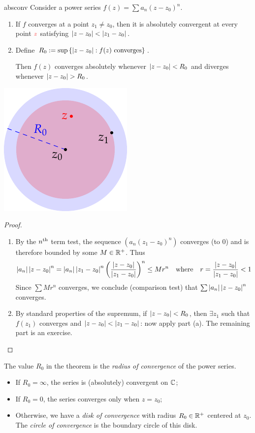 \begin{thm}[lower separated=false, sidebyside, sidebyside align=top seam, sidebyside gap=0pt, righthand width=0.25\linewidth]{}{absconv}
Consider a power series $f(z)=\sum a_n(z-z_0)^n$.
\begin{enumerate}
	\item If $f$ converges at a point $z_1\neq z_0$, then it is absolutely convergent at every point $\textcolor{red}{z}$ satisfying $\left| z-z_0\right|<\left| z_1-z_0\right|$.
	\item Define $R_0:=\sup\left\{\left| z-z_0\right|: f(z) \text{ converges}\right\}$.\par
	Then $f(z)$ converges absolutely whenever $\left| z-z_0\right|<R_0$ and diverges whenever $\nm{z-z_0}>R_0$.
\end{enumerate}
\tcblower
\flushright\includegraphics[scale=0.85]{conv}
\end{thm}

\begin{proof}
\begin{enumerate}\itemsep2pt
  \item By the $n\textsuperscript{th}$ term test, the sequence $(a_n(z_1-z_0)^n)$ converges (to 0) and is therefore bounded by some $M\in\mathbb{R}^+$. Thus
	\[\left| a_n\right|\left| z-z_0\right|^n =\left| a_n\right|\left| z_1-z_0\right|^n\left(\frac{\left| z-z_0\right|}{\left| z_1-z_0\right|}\right)^n \le Mr^n\quad\text{where}\quad r=\frac{\left| z-z_0\right|}{\left| z_1-z_0\right|}<1\]
	Since $\sum Mr^n$ converges, we conclude (comparison test) that $\sum\left| a_n\right|\left| z-z_0\right|^n$ converges.
	\item By standard properties of the supremum, if $\left| z-z_0\right|<R_0$, then $\exists z_1$ such that $f(z_1)$ converges and $\left| z-z_0\right|<\left| z_1-z_0\right|$: now apply part (a). The remaining part is an exercise.\qedhere
\end{enumerate}
\end{proof}

\begin{defn}{}{}
The value $R_0$ in the theorem is the \emph{radius of convergence} of the power series.
\begin{itemize}\itemsep2pt
  \item If $R_0=\infty$, the series is (absolutely) convergent on $\mathbb{C}$;
  \item If $R_0=0$, the series converges only when $z=z_0$;
  \item Otherwise, we have a \emph{disk of convergence} with radius $R_0\in\mathbb{R}^+$ centered at $z_0$. The \emph{circle of convergence} is the boundary circle of this disk.
\end{itemize}
\end{defn}
\goodbreak

